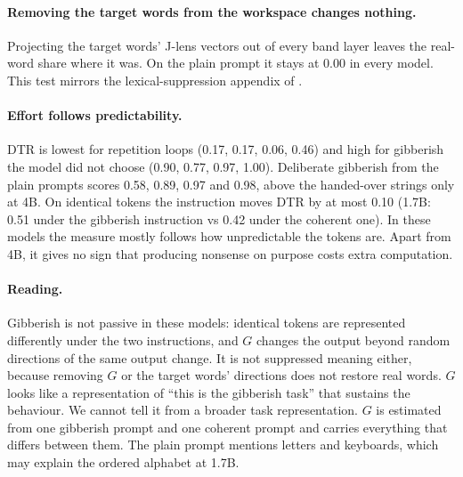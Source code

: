 \documentclass[11pt]{article}
\begin{document}
\paragraph{Removing the target words from the workspace changes nothing.} Projecting the target words' J-lens vectors out of every band layer leaves the real-word share where it was. On the plain prompt it stays at 0.00 in every model. This test mirrors the lexical-suppression appendix of \citet{gurnee2026workspace}.

\paragraph{Effort follows predictability.} DTR is lowest for repetition loops (0.17, 0.17, 0.06, 0.46) and high for gibberish the model did not choose (0.90, 0.77, 0.97, 1.00). Deliberate gibberish from the plain prompts scores 0.58, 0.89, 0.97 and 0.98, above the handed-over strings only at 4B. On identical tokens the instruction moves DTR by at most 0.10 (1.7B: 0.51 under the gibberish instruction vs 0.42 under the coherent one). In these models the measure mostly follows how unpredictable the tokens are. Apart from 4B, it gives no sign that producing nonsense on purpose costs extra computation.

\paragraph{Reading.} Gibberish is not passive in these models: identical tokens are represented differently under the two instructions, and $G$ changes the output beyond random directions of the same output change. It is not suppressed meaning either, because removing $G$ or the target words' directions does not restore real words. $G$ looks like a representation of ``this is the gibberish task'' that sustains the behaviour. We cannot tell it from a broader task representation. $G$ is estimated from one gibberish prompt and one coherent prompt and carries everything that differs between them. The plain prompt mentions letters and keyboards, which may explain the ordered alphabet at 1.7B.
\end{document}
